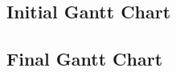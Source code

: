 \documentclass[../documentation.tex]{subfiles}
\begin{document}
\subsection{Initial Gantt Chart}

\subsection{Final Gantt Chart}
\end{document}
